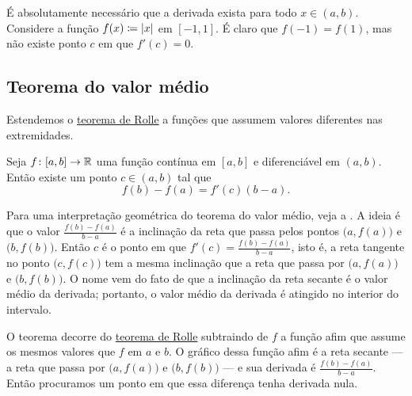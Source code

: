 É absolutamente necessário que a derivada exista para todo $x
\in (a,b)$. Considere a função $f(x) \coloneqq \lvert {x} \rvert$ em $[-1,1]$.
É claro que $f(-1) = f(1)$, mas não existe ponto $c$ em que $f'(c) = 0$.

\subsection{Teorema do valor médio}

Estendemos o \hyperref[thm:rolle]{teorema de Rolle}
a funções que assumem valores diferentes
nas extremidades.

\begin{thm} \label{thm:mvt}
Seja $f \colon [a,b] \to {\mathbb{R}}$ uma função contínua em $[a,b]$
e diferenciável em $(a,b)$. Então existe um ponto $c \in (a,b)$
tal que
\begin{equation*}
f(b)-f(a) = f'(c)(b-a) .
\end{equation*}
\end{thm}

Para uma interpretação geométrica do teorema do valor médio, veja a
. A ideia é que o valor $\frac{f(b)-f(a)}{b-a}$
é a inclinação da reta que passa pelos pontos $\bigl(a,f(a)\bigr)$
e $\bigl(b,f(b)\bigr)$.
Então $c$ é o ponto em que $f'(c) = \frac{f(b)-f(a)}{b-a}$, isto
é, a reta tangente no ponto $\bigl(c,f(c)\bigr)$ tem a mesma inclinação que a
reta que passa por $\bigl(a,f(a)\bigr)$ e $\bigl(b,f(b)\bigr)$.
O nome vem do fato de que a inclinação da reta secante
é o valor médio da derivada; portanto, o valor médio da derivada é atingido
no interior do intervalo.

O teorema decorre do \hyperref[thm:rolle]{teorema de Rolle}
subtraindo de $f$ a função afim
que assume os mesmos valores que $f$ em $a$ e $b$.
O gráfico dessa função afim é a
reta secante — a reta que passa por
$\bigl(a,f(a)\bigr)$ e $\bigl(b,f(b)\bigr)$ — e sua derivada é
$\frac{f(b)-f(a)}{b-a}$.
Então procuramos um ponto em que essa
diferença tenha derivada nula.

\begin{myfigureht}
\caption{Interpretação gráfica do teorema do valor médio.\label{mvtfig}}
\end{myfigureht}


